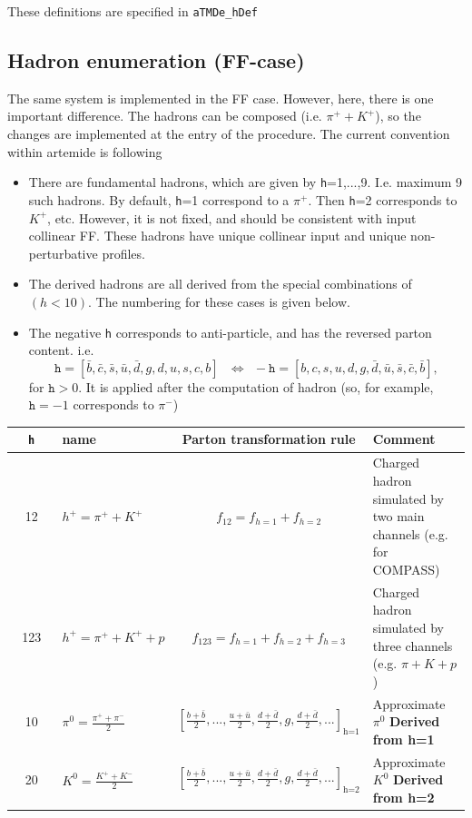\documentclass[prd,nofootinbib,eqsecnum,final]{revtex4}
\renewcommand{\(}{\left(}
\renewcommand{\)}{\right)}
\renewcommand{\[}{\left[}
\renewcommand{\]}{\right]}
\begin{document}
\begin{tcolorbox}
\begin{center}
These definitions are specified in \texttt{aTMDe\_hDef}
\end{center}
\end{tcolorbox}

\subsection{Hadron enumeration (FF-case)}

The same system is implemented in the FF case. However, here, there is one important difference. The hadrons can be composed (i.e. $\pi^++K^+$), so the changes are implemented at the entry of the procedure. The current convention within artemide is following
\begin{itemize}
\item There are fundamental hadrons, which are given by \texttt{h}=1,...,9. I.e. maximum 9 such hadrons. By default, \texttt{h}=1 correspond to a $\pi^+$. Then \texttt{h}=2 corresponds to $K^+$, etc. However, it is not fixed, and should be consistent with input collinear FF. These hadrons have unique collinear input and unique non-perturbative profiles.
\item The derived hadrons are all derived from the special combinations of $(h<10)$. The numbering for these cases is given below.
\item The negative \texttt{h} corresponds to anti-particle, and has the reversed parton content. i.e.
$$
\texttt{h}= [\bar b,\bar c,\bar s,\bar u,\bar d,g,d,u,s,c,b]~~~\Leftrightarrow~~
-\texttt{h}= [b,c,s,u,d,g,\bar d,\bar u,\bar s,\bar c,\bar b],
$$
for $\texttt{h}>0$. It is applied after the computation of hadron (so, for example, $\texttt{h}=-1$ corresponds to $\pi^-$)
\end{itemize}
\begin{center}
\begin{tabular}{||c|l|c|p{6cm}||}
\hline
~~\texttt{h}~~ & name & Parton transformation rule & Comment
\\\hline
12 & $h^+=\pi^++K^+$ & $f_{12}=f_{h=1}+f_{h=2}$ & Charged hadron simulated by two main channels (e.g. for COMPASS)
\\\hline
123 & $h^+=\pi^++K^++p$ & $f_{123}=f_{h=1}+f_{h=2}+f_{h=3}$ & Charged hadron simulated by three channels (e.g. $\pi+K+p$)
\\\hline
10 & $\pi^0=\frac{\pi^++\pi^-}{2}$ & $[\frac{b+\bar b}{2},..., \frac{u+\bar u}{2},\frac{d+\bar d}{2},g,\frac{d+\bar d}{2},...]_{\text{h=1}}$ & Approximate $\pi^0$ \textbf{Derived from h=1}
\\\hline
20 & $K^0=\frac{K^++K^-}{2}$ & $[\frac{b+\bar b}{2},..., \frac{u+\bar u}{2},\frac{d+\bar d}{2},g,\frac{d+\bar d}{2},...]_{\text{h=2}}$ & Approximate $K^0$ \textbf{Derived from h=2}
\\\hline\hline
\end{tabular}
\end{center}
\end{document}
